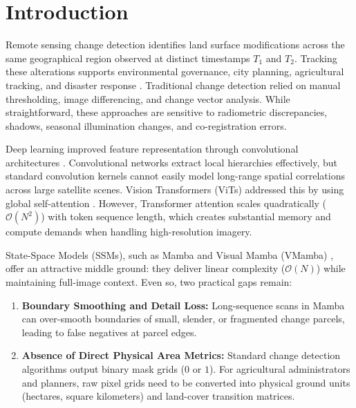 \documentclass[final,5p,times,twocolumn]{elsarticle}
\begin{document}
\section{Introduction}
\label{sec:intro}
Remote sensing change detection identifies land surface modifications across the same geographical region observed at distinct timestamps $T_1$ and $T_2$. Tracking these alterations supports environmental governance, city planning, agricultural tracking, and disaster response \citep{ding2025survey}. Traditional change detection relied on manual thresholding, image differencing, and change vector analysis. While straightforward, these approaches are sensitive to radiometric discrepancies, shadows, seasonal illumination changes, and co-registration errors.

Deep learning improved feature representation through convolutional architectures \citep{daudt2018fully, fang2022snunet}. Convolutional networks extract local hierarchies effectively, but standard convolution kernels cannot easily model long-range spatial correlations across large satellite scenes. Vision Transformers (ViTs) addressed this by using global self-attention \citep{chen2022remote, bandara2022transformer}. However, Transformer attention scales quadratically ($\mathcal{O}(N^2)$) with token sequence length, which creates substantial memory and compute demands when handling high-resolution imagery.

State-Space Models (SSMs), such as Mamba and Visual Mamba (VMamba) \citep{chen2024changemamba}, offer an attractive middle ground: they deliver linear complexity ($\mathcal{O}(N)$) while maintaining full-image context. Even so, two practical gaps remain:
\begin{enumerate}
    \item \textbf{Boundary Smoothing and Detail Loss:} Long-sequence scans in Mamba can over-smooth boundaries of small, slender, or fragmented change parcels, leading to false negatives at parcel edges.
    \item \textbf{Absence of Direct Physical Area Metrics:} Standard change detection algorithms output binary mask grids ($0$ or $1$). For agricultural administrators and planners, raw pixel grids need to be converted into physical ground units (hectares, square kilometers) and land-cover transition matrices.
\end{enumerate}
\end{document}
